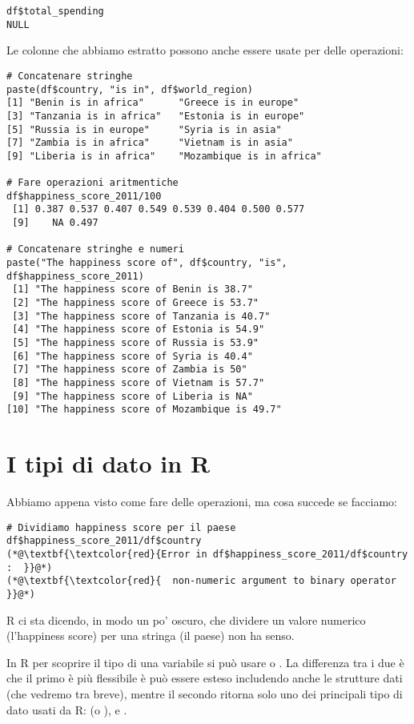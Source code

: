 \begin{lstlisting}[style=Rstyle]
df$total_spending
NULL
\end{lstlisting}

\noindent Le colonne che abbiamo estratto possono anche essere usate per delle operazioni:

\begin{lstlisting}[style=Rstyle]	
# Concatenare stringhe	
paste(df$country, "is in", df$world_region)
[1] "Benin is in africa"      "Greece is in europe"    
[3] "Tanzania is in africa"   "Estonia is in europe"   
[5] "Russia is in europe"     "Syria is in asia"       
[7] "Zambia is in africa"     "Vietnam is in asia"     
[9] "Liberia is in africa"    "Mozambique is in africa"

# Fare operazioni aritmentiche
df$happiness_score_2011/100
 [1] 0.387 0.537 0.407 0.549 0.539 0.404 0.500 0.577
 [9]    NA 0.497

# Concatenare stringhe e numeri
paste("The happiness score of", df$country, "is", df$happiness_score_2011)
 [1] "The happiness score of Benin is 38.7"     
 [2] "The happiness score of Greece is 53.7"    
 [3] "The happiness score of Tanzania is 40.7"  
 [4] "The happiness score of Estonia is 54.9"   
 [5] "The happiness score of Russia is 53.9"    
 [6] "The happiness score of Syria is 40.4"     
 [7] "The happiness score of Zambia is 50"      
 [8] "The happiness score of Vietnam is 57.7"   
 [9] "The happiness score of Liberia is NA"     
[10] "The happiness score of Mozambique is 49.7"
\end{lstlisting}


\section{I tipi di dato in R}

Abbiamo appena visto come fare delle operazioni, ma cosa succede se facciamo:

\begin{lstlisting}[style=Rstyle]	
# Dividiamo happiness score per il paese	
df$happiness_score_2011/df$country
(*@\textbf{\textcolor{red}{Error in df$happiness_score_2011/df$country :  }}@*)
(*@\textbf{\textcolor{red}{  non-numeric argument to binary operator }}@*)
\end{lstlisting}
%
R ci sta dicendo, in modo un po' oscuro, che dividere un valore numerico (l'happiness score) per una stringa (il paese) non ha senso. 

\noindent In R per scoprire il tipo di una variabile si pu\`o usare  o . La differenza tra i due \`e che il primo \`e pi\`u flessibile \`e pu\`o essere esteso includendo anche le strutture dati (che vedremo tra breve), mentre il secondo ritorna solo uno dei principali tipo di dato usati da R:  (o ),  e . 

